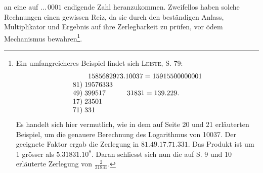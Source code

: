 an eine auf $\ldots\,0001$ endigende Zahl heranzukommen. Zweifellos haben solche
Rechnungen einen gewissen Reiz, da sie durch den beständigen Anlass,
\clearpage{}
\setcounter{footnote}{0}
\noindent Multiplikator und Ergebnis auf ihre Zerlegbarkeit zu prüfen, vor ödem Mechanismus bewahren\footnote{Ein umfangreicheres Beispiel findet sich \textsc{Leiste}, S. 79:
\[
\begin{array}{r@{\;}l@{\qquad}l}
&\multicolumn{2}{l}{1585682973\mathord{.}10037=15915500000001}\\
81)&19576333&\\
49)&399517&31831=139\mathord{.}229.\\
17)&23501&\\
71)&331&
\end{array}
\]
\noindent Es handelt sich hier vermutlich, wie in dem auf Seite 20 und 21 erläuterten Beispiel, um die genauere Berechnung des Logarithmus von 10037. Der geeignete Faktor ergab die Zerlegung in $81\mathord{.}49\mathord{.}17\mathord{.}71\mathord{.}331$. Das Produkt ist um 1 grösser als $5\mathord{.}31831\mathord{.}10^8$. Daran schliesst sich nun die auf S. 9 und 10 erläuterte Zerlegung von $\frac{2}{31831}$.}.

